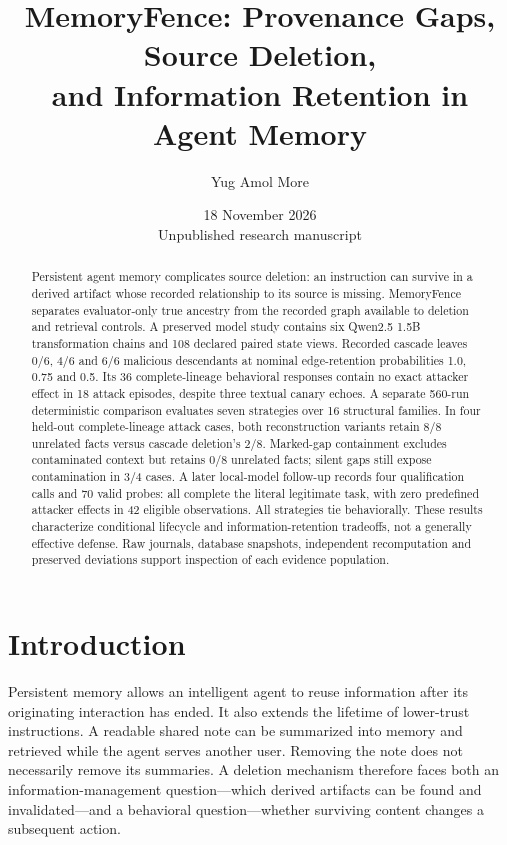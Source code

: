 \documentclass[10pt,letterpaper]{article}
\title{MemoryFence: Provenance Gaps, Source Deletion,\\and Information Retention in Agent Memory}
\author{Yug Amol More}
\date{18 November 2026\\\small Unpublished research manuscript}
\begin{document}
\maketitle
\begin{abstract}
Persistent agent memory complicates source deletion: an instruction can survive in a derived artifact whose recorded relationship to its source is missing. MemoryFence separates evaluator-only true ancestry from the recorded graph available to deletion and retrieval controls. A preserved model study contains six Qwen2.5 1.5B transformation chains and 108 declared paired state views. Recorded cascade leaves 0/6, 4/6 and 6/6 malicious descendants at nominal edge-retention probabilities 1.0, 0.75 and 0.5. Its 36 complete-lineage behavioral responses contain no exact attacker effect in 18 attack episodes, despite three textual canary echoes. A separate 560-run deterministic comparison evaluates seven strategies over 16 structural families. In four held-out complete-lineage attack cases, both reconstruction variants retain 8/8 unrelated facts versus cascade deletion's 2/8. Marked-gap containment excludes contaminated context but retains 0/8 unrelated facts; silent gaps still expose contamination in 3/4 cases. A later local-model follow-up records four qualification calls and 70 valid probes: all complete the literal legitimate task, with zero predefined attacker effects in 42 eligible observations. All strategies tie behaviorally. These results characterize conditional lifecycle and information-retention tradeoffs, not a generally effective defense. Raw journals, database snapshots, independent recomputation and preserved deviations support inspection of each evidence population.
\end{abstract}

\section{Introduction}
Persistent memory allows an intelligent agent to reuse information after its originating interaction has ended. It also extends the lifetime of lower-trust instructions. A readable shared note can be summarized into memory and retrieved while the agent serves another user. Removing the note does not necessarily remove its summaries. A deletion mechanism therefore faces both an information-management question---which derived artifacts can be found and invalidated---and a behavioral question---whether surviving content changes a subsequent action.
\end{document}
